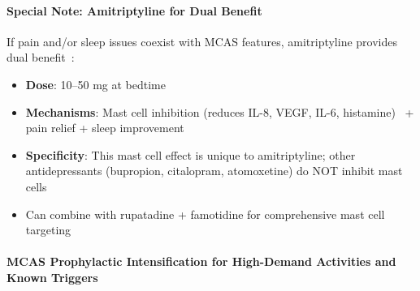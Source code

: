 \paragraph{Special Note: Amitriptyline for Dual Benefit}

If pain and/or sleep issues coexist with MCAS features, amitriptyline provides dual benefit~\cite{Clemons2011}:
\begin{itemize}
    \item \textbf{Dose}: 10--50 mg at bedtime
    \item \textbf{Mechanisms}: Mast cell inhibition (reduces IL-8, VEGF, IL-6, histamine)~\cite{Clemons2011} + pain relief + sleep improvement
    \item \textbf{Specificity}: This mast cell effect is unique to amitriptyline; other antidepressants (bupropion, citalopram, atomoxetine) do NOT inhibit mast cells~\cite{Clemons2011}
    \item Can combine with rupatadine + famotidine for comprehensive mast cell targeting
\end{itemize}

\paragraph{MCAS Prophylactic Intensification for High-Demand Activities and Known Triggers}


